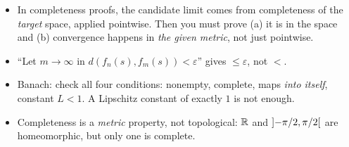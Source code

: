 \begin{tip}
\begin{itemize}
\item In completeness proofs, the candidate limit comes from completeness of the
  \emph{target} space, applied pointwise. Then you must prove (a) it is in the space and (b)
  convergence happens in \emph{the given metric}, not just pointwise.
\item ``Let $m\to\infty$ in $d(f_n(s),f_m(s))<\varepsilon$'' gives $\le\varepsilon$, not $<$.
\item Banach: check all four conditions: nonempty, complete, maps \emph{into itself},
  constant $L<1$. A Lipschitz constant of exactly $1$ is not enough.
\item Completeness is a \emph{metric} property, not topological: $\mathbb R$ and
  $\mathopen{]}-\pi/2,\pi/2\mathclose{[}$ are homeomorphic, but only one is complete.
\end{itemize}
\end{tip}
